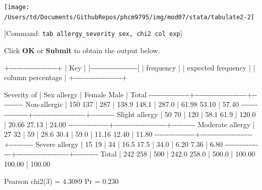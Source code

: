 \documentclass[
]{memoir}
\newenvironment{Shaded}{\begin{snugshade}}{\end{snugshade}}
\newcommand{\NormalTok}[1]{#1}
\begin{document}
\texttt{[image: /Users/td/Documents/GithubRepos/phcm9795/img/mod07/stata/tabulate2-2]}

{[}Command: \texttt{tab\ allergy\_severity\ sex,\ chi2\ col\ exp}{]}

Click \textbf{OK} or \textbf{Submit} to obtain the output below.

\begin{Shaded}
\begin{Highlighting}[]
\NormalTok{+{-}{-}{-}{-}{-}{-}{-}{-}{-}{-}{-}{-}{-}{-}{-}{-}{-}{-}{-}{-}+}
\NormalTok{| Key                |}
\NormalTok{|{-}{-}{-}{-}{-}{-}{-}{-}{-}{-}{-}{-}{-}{-}{-}{-}{-}{-}{-}{-}|}
\NormalTok{|     frequency      |}
\NormalTok{| expected frequency |}
\NormalTok{| column percentage  |}
\NormalTok{+{-}{-}{-}{-}{-}{-}{-}{-}{-}{-}{-}{-}{-}{-}{-}{-}{-}{-}{-}{-}+}

\NormalTok{     Severity of |          Sex}
\NormalTok{         allergy |    Female       Male |     Total}
\NormalTok{{-}{-}{-}{-}{-}{-}{-}{-}{-}{-}{-}{-}{-}{-}{-}{-}{-}+{-}{-}{-}{-}{-}{-}{-}{-}{-}{-}{-}{-}{-}{-}{-}{-}{-}{-}{-}{-}{-}{-}+{-}{-}{-}{-}{-}{-}{-}{-}{-}{-}}
\NormalTok{    Non{-}allergic |       150        137 |       287 }
\NormalTok{                 |     138.9      148.1 |     287.0 }
\NormalTok{                 |     61.98      53.10 |     57.40 }
\NormalTok{{-}{-}{-}{-}{-}{-}{-}{-}{-}{-}{-}{-}{-}{-}{-}{-}{-}+{-}{-}{-}{-}{-}{-}{-}{-}{-}{-}{-}{-}{-}{-}{-}{-}{-}{-}{-}{-}{-}{-}+{-}{-}{-}{-}{-}{-}{-}{-}{-}{-}}
\NormalTok{  Slight allergy |        50         70 |       120 }
\NormalTok{                 |      58.1       61.9 |     120.0 }
\NormalTok{                 |     20.66      27.13 |     24.00 }
\NormalTok{{-}{-}{-}{-}{-}{-}{-}{-}{-}{-}{-}{-}{-}{-}{-}{-}{-}+{-}{-}{-}{-}{-}{-}{-}{-}{-}{-}{-}{-}{-}{-}{-}{-}{-}{-}{-}{-}{-}{-}+{-}{-}{-}{-}{-}{-}{-}{-}{-}{-}}
\NormalTok{Moderate allergy |        27         32 |        59 }
\NormalTok{                 |      28.6       30.4 |      59.0 }
\NormalTok{                 |     11.16      12.40 |     11.80 }
\NormalTok{{-}{-}{-}{-}{-}{-}{-}{-}{-}{-}{-}{-}{-}{-}{-}{-}{-}+{-}{-}{-}{-}{-}{-}{-}{-}{-}{-}{-}{-}{-}{-}{-}{-}{-}{-}{-}{-}{-}{-}+{-}{-}{-}{-}{-}{-}{-}{-}{-}{-}}
\NormalTok{  Severe allergy |        15         19 |        34 }
\NormalTok{                 |      16.5       17.5 |      34.0 }
\NormalTok{                 |      6.20       7.36 |      6.80 }
\NormalTok{{-}{-}{-}{-}{-}{-}{-}{-}{-}{-}{-}{-}{-}{-}{-}{-}{-}+{-}{-}{-}{-}{-}{-}{-}{-}{-}{-}{-}{-}{-}{-}{-}{-}{-}{-}{-}{-}{-}{-}+{-}{-}{-}{-}{-}{-}{-}{-}{-}{-}}
\NormalTok{           Total |       242        258 |       500 }
\NormalTok{                 |     242.0      258.0 |     500.0 }
\NormalTok{                 |    100.00     100.00 |    100.00 }

\NormalTok{          Pearson chi2(3) =   4.3089   Pr = 0.230}
\end{Highlighting}
\end{Shaded}
\end{document}
